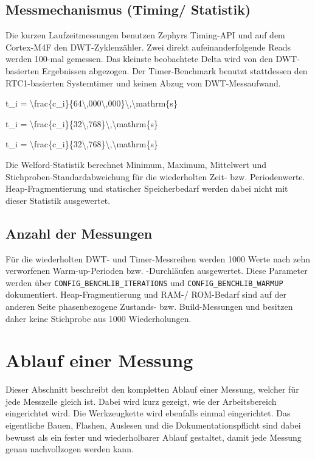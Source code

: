 \subsection{Messmechanismus (Timing/ Statistik)}
Die kurzen Laufzeitmessungen benutzen Zephyrs Timing-API und auf dem Cortex-M4F den DWT-Zyklenz{\"a}hler. Zwei direkt aufeinanderfolgende Reads werden 100-mal gemessen. Das kleinste beobachtete Delta wird von den DWT-basierten Ergebnissen abgezogen. Der Timer-Benchmark benutzt stattdessen den RTC1-basierten Systemtimer und keinen Abzug vom DWT-Messaufwand.

t\_i = \textbackslash{}frac\{c\_i\}\{64\textbackslash{},000\textbackslash{},000\}\textbackslash{},\textbackslash{}mathrm\{s\}

t\_i = \textbackslash{}frac\{c\_i\}\{32\textbackslash{},768\}\textbackslash{},\textbackslash{}mathrm\{s\}

t\_i = \textbackslash{}frac\{c\_i\}\{32\textbackslash{},768\}\textbackslash{},\textbackslash{}mathrm\{s\}

Die Welford-Statistik berechnet Minimum, Maximum, Mittelwert und Stichproben-Standardabweichung f{\"u}r die wiederholten Zeit- bzw. Periodenwerte. Heap-Fragmentierung und statischer Speicherbedarf werden dabei nicht mit dieser Statistik ausgewertet.

\subsection{Anzahl der Messungen}
F{\"u}r die wiederholten DWT- und Timer-Messreihen werden 1000 Werte nach zehn verworfenen Warm-up-Perioden bzw. -Durchl{\"a}ufen ausgewertet. Diese Parameter werden {\"u}ber \lstinline[style=codeinline]|CONFIG_BENCHLIB_ITERATIONS| und \lstinline[style=codeinline]|CONFIG_BENCHLIB_WARMUP| dokumentiert. Heap-Fragmentierung und RAM-/ ROM-Bedarf sind auf der anderen Seite phasenbezogene Zustands- bzw. Build-Messungen und besitzen daher keine Stichprobe aus 1000 Wiederholungen.

\section{Ablauf einer Messung}
Dieser Abschnitt beschreibt den kompletten Ablauf einer Messung, welcher f{\"u}r jede Messzelle gleich ist. Dabei wird kurz gezeigt, wie der Arbeitsbereich eingerichtet wird. Die Werkzeugkette wird ebenfalls einmal eingerichtet. Das eigentliche Bauen, Flashen, Auslesen und die Dokumentationspflicht sind dabei bewusst als ein fester und wiederholbarer Ablauf gestaltet, damit jede Messung genau nachvollzogen werden kann.

